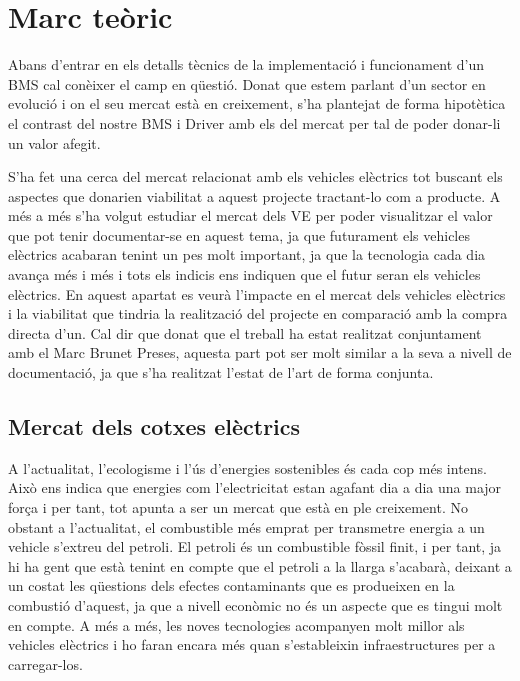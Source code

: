 \chapter{Marc teòric}
\label{chap:pw}
Abans d'entrar en els detalls tècnics de la implementació i funcionament d'un BMS cal conèixer el camp en qüestió. Donat que estem parlant d'un sector en evolució i on el seu mercat està en creixement, s'ha plantejat de forma hipotètica el contrast del nostre BMS i Driver amb els del mercat per tal de poder donar-li un valor afegit. 

S'ha fet una cerca del mercat relacionat amb els vehicles elèctrics tot buscant els aspectes que donarien viabilitat a aquest projecte tractant-lo com a producte. A més a més s'ha volgut estudiar el mercat dels VE per poder visualitzar el valor que pot tenir documentar-se en aquest tema, ja que futurament els vehicles elèctrics acabaran tenint un pes molt important, ja que la tecnologia cada dia avança més i més i tots els indicis ens indiquen que el futur seran els vehicles elèctrics.
En aquest apartat es veurà l'impacte en el mercat dels vehicles elèctrics i la viabilitat que tindria la realització del projecte en comparació amb la compra directa d'un. Cal dir que donat que el treball ha estat realitzat conjuntament amb el Marc Brunet Preses, aquesta part pot ser molt similar a la seva a nivell de documentació, ja que s'ha realitzat l'estat de l'art de forma conjunta.

\section{Mercat dels cotxes elèctrics}

A l'actualitat, l'ecologisme i l'ús d'energies sostenibles és cada cop més intens. Això ens indica que energies com l'electricitat estan agafant dia a dia una major força i per tant, tot apunta a ser un mercat que està en ple creixement. No obstant a l'actualitat, el combustible més emprat per transmetre energia a un vehicle s'extreu del petroli. El petroli és un combustible fòssil finit, i per tant, ja hi ha gent que està tenint en compte que el petroli a la llarga s'acabarà, deixant a un costat les qüestions dels efectes contaminants que es produeixen en la combustió d'aquest, ja que a nivell econòmic no és un aspecte que es tingui molt en compte. A més a més, les noves tecnologies acompanyen molt millor als vehicles elèctrics i ho faran encara més quan s'estableixin infraestructures per a carregar-los. 

